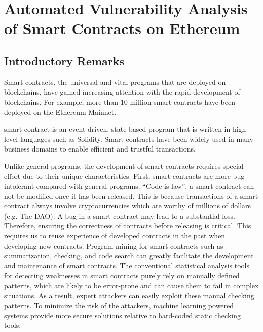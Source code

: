 \chapter{Automated Vulnerability Analysis of Smart Contracts on Ethereum} 
\label{ch:Slither-simil}


\section{Introductory Remarks}
Smart contracts, the universal and vital programs that are deployed on blockchains, have gained increasing attention with the rapid development of blockchains.
For example, more than 10 million smart contracts have been deployed on the Ethereum Mainnet.

smart contract is an event-driven, state-based program that is written in high level languages such as Solidity.
Smart contracts have been widely used in many business domains to enable efficient and trustful transactions.

Unlike general programs, the development of smart contracts requires special effort due to their unique characteristics.
First, smart contracts are more bug intolerant compared with general programs.
“Code is law”, a smart contract can not be modified once it has been released. 
This is because transactions of a smart contract always involve cryptocurrencies which are worthy of millions of dollars (e.g. The DAO). 
A bug in a smart contract may lead to a substantial loss.
Therefore, ensuring the correctness of contracts before releasing is critical.
 This requires us to reuse experience of developed contracts in the past when developing new contracts.
Program mining for smart contracts such as summarization, checking, and code search can greatly facilitate the development and maintenance of smart contracts.
The conventional statistical analysis tools for detecting weaknesses in smart contracts purely rely on manually defined patterns, which are likely to be error-prone and can cause them to fail in complex situations.
As a result, expert attackers can easily exploit these manual checking patterns.
To minimize the risk of the attackers, machine learning powered systems provide more secure solutions relative to hard-coded static checking tools.

